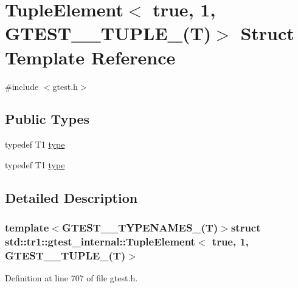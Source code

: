 \hypertarget{structstd_1_1tr1_1_1gtest__internal_1_1TupleElement_3_01true_00_011_00_01GTEST__10__TUPLE___07T_08_4}{\section{\-Tuple\-Element$<$ true, 1, \-G\-T\-E\-S\-T\-\_\-\_\-\-T\-U\-P\-L\-E\-\_\-(\-T)$>$ \-Struct \-Template \-Reference}
\label{d3/df2/structstd_1_1tr1_1_1gtest__internal_1_1TupleElement_3_01true_00_011_00_01GTEST__10__TUPLE___07T_08_4}
}


{\ttfamily \#include $<$gtest.\-h$>$}

\subsection*{\-Public \-Types}
\begin{DoxyCompactItemize}
\item 
typedef \-T1 \hyperlink{structstd_1_1tr1_1_1gtest__internal_1_1TupleElement_3_01true_00_011_00_01GTEST__10__TUPLE___07T_08_4_a8628f95f627e63dcdb1268870410d6ab}{type}
\item 
typedef \-T1 \hyperlink{structstd_1_1tr1_1_1gtest__internal_1_1TupleElement_3_01true_00_011_00_01GTEST__10__TUPLE___07T_08_4_a8628f95f627e63dcdb1268870410d6ab}{type}
\end{DoxyCompactItemize}


\subsection{\-Detailed \-Description}
\subsubsection*{template$<$\-G\-T\-E\-S\-T\-\_\-\_\-\-T\-Y\-P\-E\-N\-A\-M\-E\-S\-\_\-(\-T)$>$struct std\-::tr1\-::gtest\-\_\-internal\-::\-Tuple\-Element$<$ true, 1, G\-T\-E\-S\-T\-\_\-\_\-\-T\-U\-P\-L\-E\-\_\-(\-T)$>$}



\-Definition at line 707 of file gtest.\-h.



